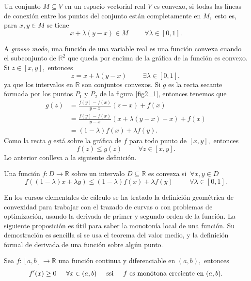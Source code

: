 \begin{definition}
	Un conjunto $M \subseteq V$ en un espacio vectorial real $V$ es convexo, si todas las líneas de conexión entre los puntos del conjunto están completamente en $M,$ esto es, para $x, y \in M$ se tiene $$x+\lambda(y-x) \in M \hspace{1cm} \forall \lambda \in [0,1].$$
\end{definition}
A \textit{grosso modo}, una función de una variable real es una función convexa cuando el subconjunto de $\mathbb{R}^2$ que queda por encima de la gráfica de la función es convexo. Si $z \in [x,y],$ entonces $$z = x+\lambda(y-x)\hspace{1cm}\exists \lambda \in [0,1],$$ ya que los intervalos en $\mathbb{R}$ son conjuntos convexos. Si $g$ es la recta secante formada por los puntos $P_1$ y $P_2$ de la figura \ref{fig2_1}, entonces tenemos que
\begin{align*}
	g(z) &= \frac{f(y)-f(x)}{y-x}(z-x)+f(x)\\
	&= \frac{f(y)-f(x)}{y-x}(x+\lambda(y-x)-x)+f(x)\\
	&= (1-\lambda)f(x)+\lambda f(y).
\end{align*}
Como la recta $g$ está sobre la gráfica de $f$ para todo punto de $[x,y],$ entonces $$f(z) \leq g(z) \hspace{1cm} \forall z \in [x,y].$$ Lo anterior conlleva a la siguiente definición.
\begin{definition}
	Una función $f: D \rightarrow \mathbb{R}$ sobre un intervalo $D \subseteq \mathbb{R}$ es convexa si $\ \forall x, y \in D$ $$f((1-\lambda)x+\lambda y) \leq (1-\lambda)f(x)+\lambda f(y) \hspace{1cm} \forall \lambda \in [0,1].$$ 
\end{definition}
En los cursos elementales de cálculo se ha tratado la definición geométrica de convexidad para trabajar con el trazado de curvas o con problemas de optimización, usando la derivada de primer y segundo orden de la función. La siguiente proposición es útil para saber la monotonía local de una función. Su demostración es sencilla si se usa el teorema del valor medio, y la definición formal de derivada de una función sobre algún punto.
\begin{proposition}
	Sea $f:[a,b] \rightarrow \mathbb{R}$ una función continua y diferenciable en $(a,b),$ entonces $$f'(x) \geq 0 \hspace{0.5cm} \forall x \in (a,b) \hspace{0.5cm} \textrm{ssi}\hspace{0.5cm} f\  \textrm{es monótona creciente en}\ (a,b).$$
\end{proposition}
